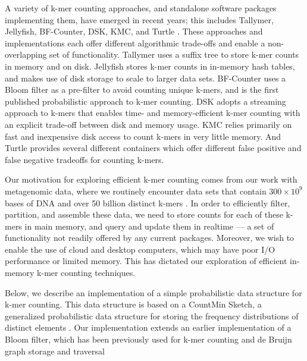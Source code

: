 \documentclass{article}
\begin{document}
A variety of k-mer counting approaches, and standalone software
packages implementing them, have emerged in recent years; this
includes Tallymer, Jellyfish, BF-Counter, DSK, KMC, and Turtle \cite{Kurtz2008,Marcais2011, Melsted2011, Rizk2013, Deorowicz2013, Roy2013}.
These
approaches and implementations each offer different algorithmic
trade-offs and enable a non-overlapping set
of functionality.  Tallymer uses a suffix tree to store k-mer counts
in memory and on disk.  Jellyfish stores k-mer counts in in-memory
hash tables, and makes use of disk storage to scale to larger
data sets.  BF-Counter uses a Bloom filter as a pre-filter to avoid
counting unique k-mers, and is the first published probabilistic approach
to k-mer counting.  DSK adopts a streaming approach to k-mers that
enables time- and memory-efficient k-mer counting with an explicit
trade-off between disk and memory usage.  KMC relies primarily
on fast and inexpensive disk access to count k-mers in very little
memory.  And Turtle provides several different containers which offer
different false positive and false negative tradeoffs for counting k-mers.

Our motivation for exploring efficient k-mer counting comes from our
work with metagenomic data, where we routinely encounter data sets
that contain $300 \times 10^9$ bases of DNA and over 50 billion
distinct k-mers \cite{Howe2012}.  In order to efficiently filter,
partition, and assemble these data, we need to store counts for each
of these k-mers in main memory, and query and update them in realtime
--- a set of functionality not readily offered by any current packages.
Moreover, we wish to enable the use of cloud and desktop
computers, which may have poor I/O performance or limited memory. This has
dictated our exploration of efficient in-memory k-mer counting
techniques.


Below, we describe an implementation of a simple probabilistic data
structure for k-mer counting.  This data structure is based on a
CountMin Sketch, a generalized probabilistic data structure for
storing the frequency distributions of distinct elements
\cite{Cormode2005}.  Our implementation extends an earlier
implementation of a Bloom filter, which has been previously used for
k-mer counting and de Bruijn graph storage and traversal
\cite{Bloom70,BroderM03,Melsted2011,Pell2012,Rizk2013,Jones2012}
\end{document}

